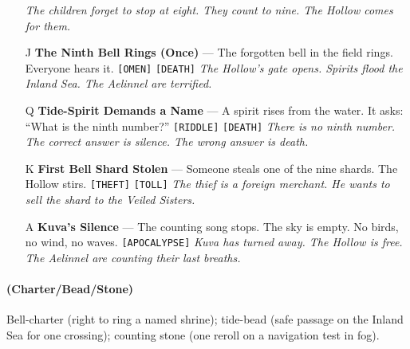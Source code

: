 \begin{enumerate}
  \hfill \textit{The children forget to stop at eight. They count to nine. The Hollow comes for them.}
\item[J] \textbf{The Ninth Bell Rings (Once)} --- The forgotten bell in the field rings. Everyone hears it. \texttt{[OMEN]} \texttt{[DEATH]}
  \hfill \textit{The Hollow's gate opens. Spirits flood the Inland Sea. The Aelinnel are terrified.}
\item[Q] \textbf{Tide-Spirit Demands a Name} --- A spirit rises from the water. It asks: ``What is the ninth number?'' \texttt{[RIDDLE]} \texttt{[DEATH]}
  \hfill \textit{There is no ninth number. The correct answer is silence. The wrong answer is death.}
\item[K] \textbf{First Bell Shard Stolen} --- Someone steals one of the nine shards. The Hollow stirs. \texttt{[THEFT]} \texttt{[TOLL]}
  \hfill \textit{The thief is a foreign merchant. He wants to sell the shard to the Veiled Sisters.}
\item[A] \textbf{Kuva's Silence} --- The counting song stops. The sky is empty. No birds, no wind, no waves. \texttt{[APOCALYPSE]}
  \hfill \textit{Kuva has turned away. The Hollow is free. The Aelinnel are counting their last breaths.}
\end{enumerate}

\paragraph*{(Charter/Bead/Stone)} Bell-charter (right to ring a named shrine); tide-bead (safe passage on the Inland Sea for one crossing); counting stone (one reroll on a navigation test in fog).

